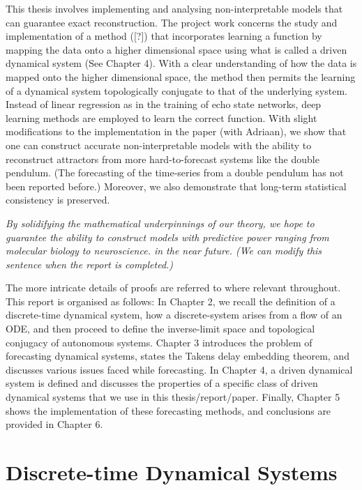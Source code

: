 \documentclass[a4paper,12pt,twoside]{report}
\begin{document}
This thesis involves implementing and analysing non-interpretable models that can guarantee exact reconstruction. 
The project work concerns the study and implementation of a method ([?]) that incorporates learning a function by mapping the data onto a higher dimensional space using what is called a driven dynamical system (See Chapter 4). With a clear understanding of how the data is mapped onto the higher dimensional space, the method then permits the learning of a dynamical system topologically conjugate to that of the underlying system. Instead of linear regression as in the training of echo state networks, deep learning methods are employed to learn the correct function. With slight modifications to the implementation in the paper (with Adriaan), we show that one can construct accurate non-interpretable models with the ability to reconstruct attractors from more hard-to-forecast systems like the double pendulum. (The forecasting of the time-series from a double pendulum has not been reported before.) Moreover, we also demonstrate that long-term statistical consistency is preserved.

\emph{By solidifying the mathematical underpinnings of our theory, we hope to guarantee the ability to construct models with predictive power ranging from molecular biology to neuroscience. in the near future. (We can modify this sentence when the report is completed.)}

The more intricate details of proofs are referred to where relevant throughout. This report is organised as follows:
\newline In Chapter 2, we recall the definition of a discrete-time dynamical system, how a discrete-system arises from a flow of an ODE, and then proceed to define the inverse-limit space and topological conjugacy of autonomous systems.
\newline Chapter 3 introduces the problem of forecasting dynamical systems, states the Takens delay embedding theorem, and discusses various issues faced while forecasting.
\newline In Chapter 4, a driven dynamical system is defined and discusses the properties of a specific class of driven dynamical systems that we use in this thesis/report/paper.
\newline Finally, Chapter 5 shows the implementation of these forecasting methods, and conclusions are provided in Chapter 6.


\chapter{Discrete-time Dynamical Systems}\label{ch2}
\end{document}
